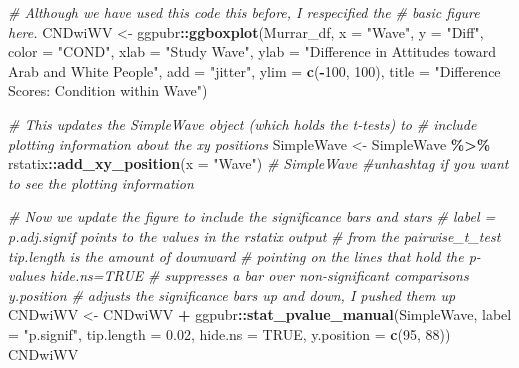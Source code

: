 \documentclass[
  11pt,
]{book}
\newenvironment{Shaded}{\begin{snugshade}}{\end{snugshade}}
\newcommand{\AttributeTok}[1]{\textcolor[rgb]{0.27,0.27,0.27}{#1}}
\newcommand{\CommentTok}[1]{\textcolor[rgb]{0.37,0.37,0.37}{\textit{#1}}}
\newcommand{\ConstantTok}[1]{\textcolor[rgb]{0.37,0.37,0.37}{#1}}
\newcommand{\DecValTok}[1]{\textcolor[rgb]{0.06,0.06,0.06}{#1}}
\newcommand{\FloatTok}[1]{\textcolor[rgb]{0.06,0.06,0.06}{#1}}
\newcommand{\FunctionTok}[1]{\textcolor[rgb]{0.27,0.27,0.27}{\textbf{#1}}}
\newcommand{\NormalTok}[1]{#1}
\newcommand{\OtherTok}[1]{\textcolor[rgb]{0.37,0.37,0.37}{#1}}
\newcommand{\SpecialCharTok}[1]{\textcolor[rgb]{0.43,0.43,0.43}{\textbf{#1}}}
\newcommand{\StringTok}[1]{\textcolor[rgb]{0.5,0.5,0.5}{#1}}
\begin{document}
\begin{Shaded}
\begin{Highlighting}[]
\CommentTok{\# Although we have used this code this before, I respecified the}
\CommentTok{\# basic figure here.}
\NormalTok{CNDwiWV }\OtherTok{\textless{}{-}}\NormalTok{ ggpubr}\SpecialCharTok{::}\FunctionTok{ggboxplot}\NormalTok{(Murrar\_df, }\AttributeTok{x =} \StringTok{"Wave"}\NormalTok{, }\AttributeTok{y =} \StringTok{"Diff"}\NormalTok{, }\AttributeTok{color =} \StringTok{"COND"}\NormalTok{,}
    \AttributeTok{xlab =} \StringTok{"Study Wave"}\NormalTok{, }\AttributeTok{ylab =} \StringTok{"Difference in Attitudes toward Arab and White People"}\NormalTok{,}
    \AttributeTok{add =} \StringTok{"jitter"}\NormalTok{, }\AttributeTok{ylim =} \FunctionTok{c}\NormalTok{(}\SpecialCharTok{{-}}\DecValTok{100}\NormalTok{, }\DecValTok{100}\NormalTok{), }\AttributeTok{title =} \StringTok{"Difference Scores: Condition within Wave"}\NormalTok{)}

\CommentTok{\# This updates the SimpleWave object (which holds the t{-}tests) to}
\CommentTok{\# include plotting information about the xy positions}
\NormalTok{SimpleWave }\OtherTok{\textless{}{-}}\NormalTok{ SimpleWave }\SpecialCharTok{\%\textgreater{}\%}
\NormalTok{    rstatix}\SpecialCharTok{::}\FunctionTok{add\_xy\_position}\NormalTok{(}\AttributeTok{x =} \StringTok{"Wave"}\NormalTok{)}
\CommentTok{\# SimpleWave \#unhashtag if you want to see the plotting information}

\CommentTok{\# Now we update the figure to include the significance bars and stars}
\CommentTok{\# label = \textquotesingle{}p.adj.signif\textquotesingle{} points to the values in the rstatix output}
\CommentTok{\# from the pairwise\_t\_test tip.length is the amount of downward}
\CommentTok{\# pointing on the lines that hold the p{-}values hide.ns=TRUE}
\CommentTok{\# suppresses a bar over non{-}significant comparisons y.position}
\CommentTok{\# adjusts the significance bars up and down, I pushed them up}
\NormalTok{CNDwiWV }\OtherTok{\textless{}{-}}\NormalTok{ CNDwiWV }\SpecialCharTok{+}\NormalTok{ ggpubr}\SpecialCharTok{::}\FunctionTok{stat\_pvalue\_manual}\NormalTok{(SimpleWave, }\AttributeTok{label =} \StringTok{"p.signif"}\NormalTok{,}
    \AttributeTok{tip.length =} \FloatTok{0.02}\NormalTok{, }\AttributeTok{hide.ns =} \ConstantTok{TRUE}\NormalTok{, }\AttributeTok{y.position =} \FunctionTok{c}\NormalTok{(}\DecValTok{95}\NormalTok{, }\DecValTok{88}\NormalTok{))}
\NormalTok{CNDwiWV}
\end{Highlighting}
\end{Shaded}
\end{document}
